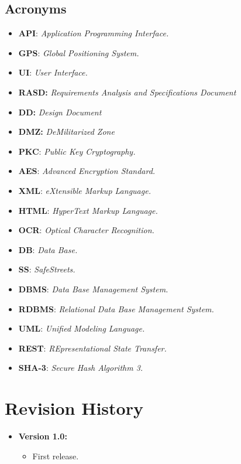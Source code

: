 \documentclass[12pt,a4paper]{report}
\begin{document}
			\subsection{Acronyms}
				\begin{itemize}
				\item \textbf{API}: \emph{Application Programming Interface.}
				\item \textbf{GPS}: \emph{Global Positioning System.}
				\item \textbf{UI}: \emph{User Interface.}
				\item \textbf{RASD:} \emph{Requirements Analysis and Specifications Document}
				\item \textbf{DD:} \emph{Design Document}
				\item \textbf{DMZ:} \emph{DeMilitarized Zone}
				\item \textbf{PKC}: \emph{Public Key Cryptography.}
				\item \textbf{AES}: \emph{Advanced Encryption Standard.}
				\item \textbf{XML}: \emph{eXtensible Markup Language.}
				\item \textbf{HTML}: \emph{HyperText Markup Language.}
				\item \textbf{OCR}: \emph{Optical Character Recognition.}
				\item \textbf{DB}: \emph{Data Base.}				
				\item \textbf{SS}: \emph{SafeStreets.}	
				\item \textbf{DBMS}: \emph{Data Base Management System.}
				\item \textbf{RDBMS}: \emph{Relational Data Base Management System.}
				\item \textbf{UML}: \emph{Unified Modeling Language.}
				\item \textbf{REST}: \emph{REpresentational State Transfer.}
				\item \textbf{SHA-3}: \emph{Secure Hash Algorithm 3.}
				\end{itemize}
		\section{Revision History}
			\begin{itemize}
				\item \textbf{Version 1.0:}
				\begin{itemize}
					\item First release.
				\end{itemize}
			\end {itemize}
\end{document}
